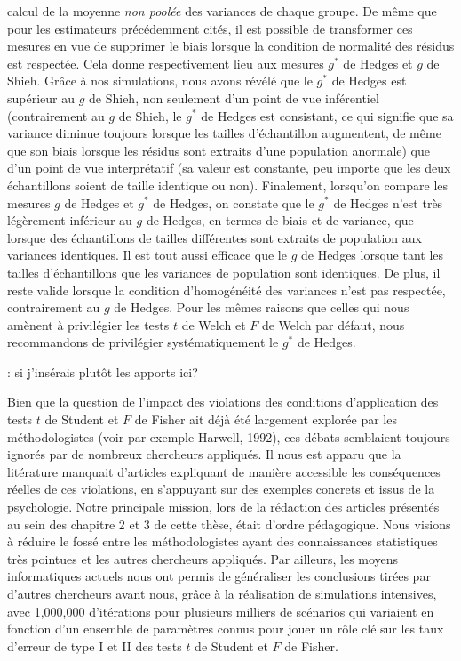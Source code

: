 \documentclass[
  12pt,
  french,
]{article}
\begin{document}
calcul de la moyenne \emph{non poolée} des variances de chaque groupe.
De même que pour les estimateurs précédemment cités, il est possible de
transformer ces mesures en vue de supprimer le biais lorsque la
condition de normalité des résidus est respectée. Cela donne
respectivement lieu aux mesures \(g^*\) de Hedges et \(g\) de Shieh.
Grâce à nos simulations, nous avons révélé que le \(g^*\) de Hedges est
supérieur au \(g\) de Shieh, non seulement d'un point de vue inférentiel
(contrairement au \(g\) de Shieh, le \(g^*\) de Hedges est consistant,
ce qui signifie que sa variance diminue toujours lorsque les tailles
d'échantillon augmentent, de même que son biais lorsque les résidus sont
extraits d'une population anormale) que d'un point de vue interprétatif
(sa valeur est constante, peu importe que les deux échantillons soient
de taille identique ou non). Finalement, lorsqu'on compare les mesures
\(g\) de Hedges et \(g^*\) de Hedges, on constate que le \(g^*\) de
Hedges n'est très légèrement inférieur au \(g\) de Hedges, en termes de
biais et de variance, que lorsque des échantillons de tailles
différentes sont extraits de population aux variances identiques. Il est
tout aussi efficace que le \(g\) de Hedges lorsque tant les tailles
d'échantillons que les variances de population sont identiques. De plus,
il reste valide lorsque la condition d'homogénéité des variances n'est
pas respectée, contrairement au \(g\) de Hedges. Pour les mêmes raisons
que celles qui nous amènent à privilégier les tests \(t\) de Welch et
\(F\) de Welch par défaut, nous recommandons de privilégier
systématiquement le \(g^*\) de Hedges.

\color{red}: si j'insérais plutôt les apports ici?

\color{blue}Bien que la question de l'impact des violations des
conditions d'application des tests \(t\) de Student et \(F\) de Fisher
ait déjà été largement explorée par les méthodologistes (voir par
exemple Harwell, 1992), ces débats semblaient toujours ignorés par de
nombreux chercheurs appliqués. Il nous est apparu que la litérature
manquait d'articles expliquant de manière accessible les conséquences
réelles de ces violations, en s'appuyant sur des exemples concrets et
issus de la psychologie. Notre principale mission, lors de la rédaction
des articles présentés au sein des chapitre 2 et 3 de cette thèse, était
d'ordre pédagogique. Nous visions à réduire le fossé entre les
méthodologistes ayant des connaissances statistiques très pointues et
les autres chercheurs appliqués. Par ailleurs, les moyens informatiques
actuels nous ont permis de généraliser les conclusions tirées par
d'autres chercheurs avant nous, grâce à la réalisation de simulations
intensives, avec 1,000,000 d'itérations pour plusieurs milliers de
scénarios qui variaient en fonction d'un ensemble de paramètres connus
pour jouer un rôle clé sur les taux d'erreur de type I et II des tests
\(t\) de Student et \(F\) de Fisher.
\end{document}
